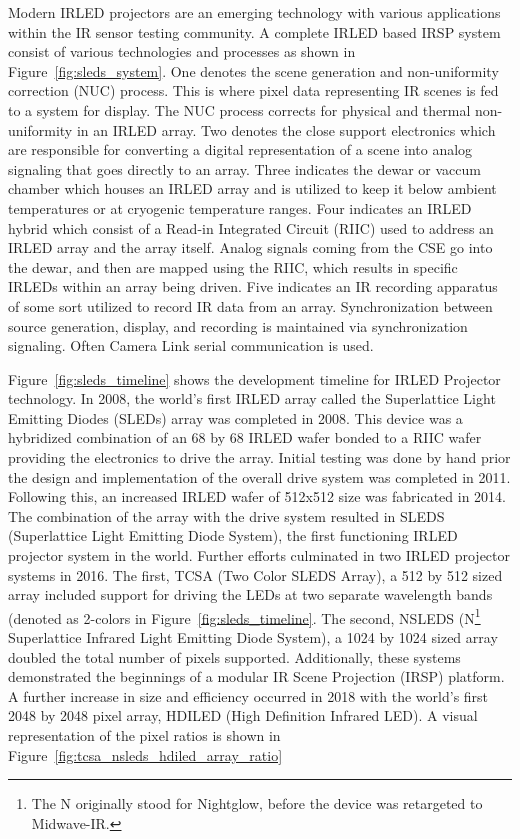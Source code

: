     Modern IRLED projectors are an emerging technology with various applications within the IR sensor testing community. A complete IRLED based IRSP system consist of various technologies and processes as shown in Figure~\ref{fig:sleds_system}. One denotes the scene generation and non-uniformity correction (NUC) process. This is where pixel data representing IR scenes is fed to a system for display. The NUC process corrects for physical and thermal non-uniformity\cite{BarakhshanEtAl2017} in an IRLED array\cite{BarakhshanEtAl2018}. Two denotes the close support electronics\cite{ejzak4} which are responsible for converting a digital representation of a scene into analog signaling that goes directly to an array. Three indicates the dewar\cite{lang1, MarksEtAl2017} or vaccum chamber which houses an IRLED array and is utilized to keep it below ambient temperatures or at cryogenic temperature ranges. Four indicates an IRLED hybrid which consist of a Read-in Integrated Circuit (RIIC)\cite{HernandezEtAl2017} used to address an IRLED array and the array itself. Analog signals coming from the CSE go into the dewar, and then are mapped using the RIIC, which results in specific IRLEDs within an array being driven. Five indicates an IR recording apparatus of some sort utilized to record IR data from an array. Synchronization between source generation, display, and recording is maintained via synchronization signaling. Often Camera Link serial communication\cite{CameraLink2000, zhu2008design} is used.


    Figure~\ref{fig:sleds_timeline} shows the development timeline for IRLED Projector technology. In 2008, the world's first IRLED array called the Superlattice Light Emitting Diodes (SLEDs) array was completed in 2008\cite{ahmed1}. This device was a hybridized combination of an 68 by 68 IRLED wafer bonded to a RIIC wafer\cite{das2} providing the electronics to drive the array. Initial testing was done by hand prior the design and implementation of the overall drive system was completed in 2011. Following this, an increased IRLED wafer of 512x512 size was fabricated in 2014\cite{norton1}. The combination of the array with the drive system resulted in SLEDS (Superlattice Light Emitting Diode System), the first functioning IRLED projector system in the world. Further efforts culminated in two IRLED projector systems in 2016. The first, TCSA (Two Color SLEDS Array), a 512 by 512 sized array\cite{McGeeEtAl2015, ejzak1, ejzak2, EjzakEtAl2016, RickerEtAl2017} included support for driving the LEDs at two separate wavelength bands (denoted as 2-colors in Figure~\ref{fig:sleds_timeline}. The second, NSLEDS (N\footnote{The N originally stood for Nightglow, before the device was retargeted to Midwave-IR.} Superlattice Infrared Light Emitting Diode System), a 1024 by 1024 sized array\cite{benedict1} doubled the total number of pixels supported. Additionally, these systems demonstrated the beginnings of a modular IR Scene Projection (IRSP) platform\cite{BrowningEtAl2019}. A further increase in size and efficiency occurred in 2018 with the world's first 2048 by 2048 pixel array, HDILED (High Definition Infrared LED). A visual representation of the pixel ratios is shown in Figure~\ref{fig:tcsa_nsleds_hdiled_array_ratio}

